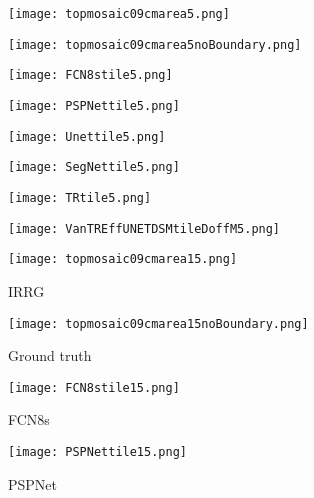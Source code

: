 \documentclass[journal]{IEEEtran}
\begin{document}
\begin{figure*}[hptb]
\begin{subfigure}{.11\textwidth}
   \texttt{[image: topmosaic09cmarea5.png]}
   \caption{}
\end{subfigure}\hfill
\begin{subfigure}{.11\textwidth}
   \texttt{[image: topmosaic09cmarea5noBoundary.png]}
   \caption{}
\end{subfigure}
\hfill
\begin{subfigure}{.11\textwidth}
   \texttt{[image: FCN8stile5.png]}
   \caption{}
\end{subfigure}
\hfill
\begin{subfigure}{.11\textwidth}
   \texttt{[image: PSPNettile5.png]}
   \caption{}
\end{subfigure}
\hfill
\begin{subfigure}{.11\textwidth}
   \texttt{[image: Unettile5.png]}
   \caption{}
\end{subfigure}
\hfill
\begin{subfigure}{.11\textwidth}
   \texttt{[image: SegNettile5.png]}
   \caption{}
\end{subfigure}
\hfill
\begin{subfigure}{.11\textwidth}
   \texttt{[image: TRtile5.png]}
   \caption{}
\end{subfigure}
\hfill
\begin{subfigure}{.11\textwidth}
   \texttt{[image: VanTREffUNETDSMtileDoffM5.png]}
   \caption{}
\end{subfigure}
\vfill
\begin{subfigure}{.11\textwidth}
   \texttt{[image: topmosaic09cmarea15.png]}
   \caption{IRRG}
\end{subfigure}
\hfill
\begin{subfigure}{.11\textwidth}
   \texttt{[image: topmosaic09cmarea15noBoundary.png]}
   \caption{Ground truth}
\end{subfigure}
\hfill
\begin{subfigure}{.11\textwidth}
   \texttt{[image: FCN8stile15.png]}
   \caption{FCN8s}
\end{subfigure}
\hfill
\begin{subfigure}{.11\textwidth}
   \texttt{[image: PSPNettile15.png]}
   \caption{PSPNet}
\end{subfigure}
\hfill

\end{figure*}
\end{document}
